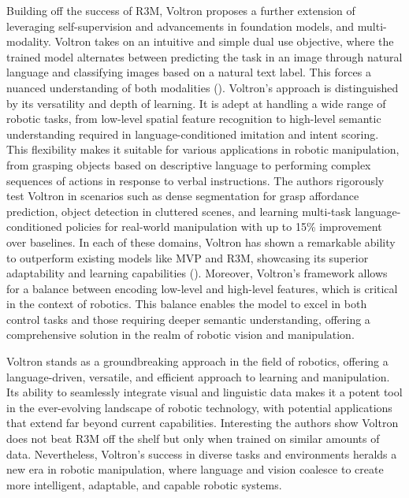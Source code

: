\documentclass[
  letterpaper,
  numbers=noenddot,
  DIV=11]{scrreprt}
\theoremstyle{plain}
\theoremstyle{definition}
\theoremstyle{remark}
\begin{document}
Building off the success of R3M, Voltron proposes a further extension of
leveraging self-supervision and advancements in foundation models, and
multi-modality. Voltron takes on an intuitive and simple dual use
objective, where the trained model alternates between predicting the
task in an image through natural language and classifying images based
on a natural text label. This forces a nuanced understanding of both
modalities ().
Voltron's approach is distinguished by its versatility and depth of
learning. It is adept at handling a wide range of robotic tasks, from
low-level spatial feature recognition to high-level semantic
understanding required in language-conditioned imitation and intent
scoring. This flexibility makes it suitable for various applications in
robotic manipulation, from grasping objects based on descriptive
language to performing complex sequences of actions in response to
verbal instructions. The authors rigorously test Voltron in scenarios
such as dense segmentation for grasp affordance prediction, object
detection in cluttered scenes, and learning multi-task
language-conditioned policies for real-world manipulation with up to
15\% improvement over baselines. In each of these domains, Voltron has
shown a remarkable ability to outperform existing models like MVP and
R3M, showcasing its superior adaptability and learning capabilities
(). Moreover, Voltron's
framework allows for a balance between encoding low-level and high-level
features, which is critical in the context of robotics. This balance
enables the model to excel in both control tasks and those requiring
deeper semantic understanding, offering a comprehensive solution in the
realm of robotic vision and manipulation.

Voltron stands as a groundbreaking approach in the field of robotics,
offering a language-driven, versatile, and efficient approach to
learning and manipulation. Its ability to seamlessly integrate visual
and linguistic data makes it a potent tool in the ever-evolving
landscape of robotic technology, with potential applications that extend
far beyond current capabilities. Interesting the authors show Voltron
does not beat R3M off the shelf but only when trained on similar amounts
of data. Nevertheless, Voltron's success in diverse tasks and
environments heralds a new era in robotic manipulation, where language
and vision coalesce to create more intelligent, adaptable, and capable
robotic systems.
\end{document}
